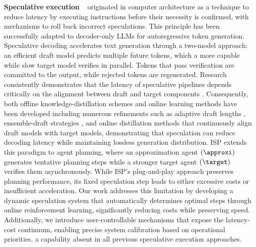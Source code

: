 \noindent \textbf{Speculative execution} ~ \citep{kocher2020spectre, xiao2019speechminer} originated in computer architecture as a technique to reduce latency by executing instructions before their necessity is confirmed, with mechanisms to roll back incorrect speculations. %
This principle has been successfully adapted to decoder-only LLMs for autoregressive token generation. Speculative decoding \citep{zhang2024beyond, leviathan2023fast} accelerates text generation through a two-model approach: an efficient draft model predicts multiple future tokens, which a more capable while slow target model verifies in parallel. Tokens that pass verification are committed to the output, while rejected tokens are regenerated. Research consistently demonstrates that the latency of speculative pipelines depends critically on the alignment between draft and target components \citep{bachmann2025judge}. Consequently, both offline knowledge-distillation schemes and online learning methods have been developed
including numerous refinements such as adaptive draft lengths \citep{liupearl}, ensemble-draft strategies \citep{lee2024inbatch, fu2025speculative}, and online distillation methods \citep{liu2023online, zhou2023distillspec, ouyang2024temperature, gui2024boosting} that continuously align draft models with target models, demonstrating that speculation can reduce decoding latency while maintaining lossless generation distribution. ISP extends this paradigm to agent planning, where an approximation agent $(\approxi)$ generates tentative planning steps while a stronger target agent $(\target)$ verifies them asynchronously. While ISP's plug-and-play approach preserves planning performance, its fixed speculation step leads to either excessive costs or insufficient acceleration. Our work addresses this limitation by developing a dynamic speculation system that automatically determines optimal steps through online reinforcement learning, significantly reducing costs while preserving speed. Additionally, we introduce user-controllable mechanisms that expose the latency-cost continuum, enabling precise system calibration based on operational priorities, a capability absent in all previous speculative execution approaches.


